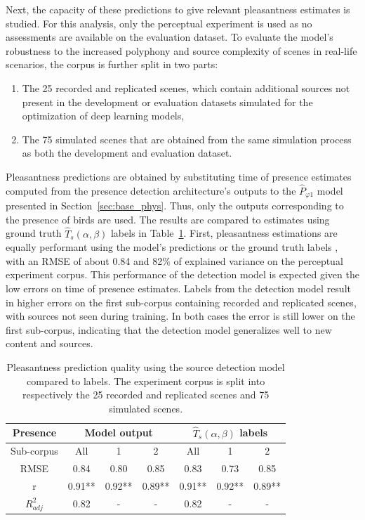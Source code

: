 \documentclass[11pt,a4paper]{article}
\begin{document}
Next, the capacity of these predictions to give relevant pleasantness estimates is studied. For this analysis, only the perceptual experiment is used as no assessments are available on the evaluation dataset. To evaluate the model's robustness to the increased polyphony and source complexity of scenes in real-life scenarios, the corpus is further split in two parts:
\begin{enumerate}
\item The 25 recorded and replicated scenes, which contain additional sources not present in the development or evaluation datasets simulated for the optimization of deep learning models,
\item The 75 simulated scenes that are obtained from the same simulation process as both the development and evaluation dataset.
\end{enumerate}
Pleasantness predictions are obtained by substituting time of presence estimates computed from the presence detection architecture's outputs to the $\hat P_{\varphi 1}$ model presented in Section~\ref{sec:base_phys}. Thus, only the outputs corresponding to the presence of birds are used. The results are compared to estimates using ground truth $\hat T_s(\alpha, \beta)$ labels in Table~\ref{tab:pppred}. First, pleasantness estimations are equally performant using the model's predictions or the ground truth labels , with an RMSE of about 0.84 and 82\% of explained variance on the perceptual experiment corpus. This performance of the detection model is expected given the low errors on time of presence estimates. Labels from the detection model result in higher errors on the first sub-corpus containing recorded and replicated scenes, with sources not seen during training. In both cases the error is still lower on the first sub-corpus, indicating that the detection model generalizes well to new content and sources.\\

\begin{table}[t]
\centering
\caption{Pleasantness prediction quality using the source detection model compared to labels. The experiment corpus is split into respectively the 25 recorded and replicated scenes and 75 simulated scenes.}
\label{tab:pppred}
\begin{tabular}{ c | c c c | c c c }
\hline
	Presence & \multicolumn{3}{|c}{Model output} & \multicolumn{3}{|c}{$\hat T_s(\alpha, \beta)$ labels} \\ \hline
	Sub-corpus & All & 1 & 2 & All & 1 & 2 \\ \hline
	RMSE & 0.84 & 0.80 & 0.85 & 0.83 & 0.73 & 0.85 \\ \hline
	r & 0.91** & 0.92** & 0.89** & 0.91** & 0.92** & 0.89** \\ \hline
	$R^2_{adj}$ & 0.82 & - & - & 0.82 & - & - \\ \hline
\end{tabular}
\end{table}
\end{document}
